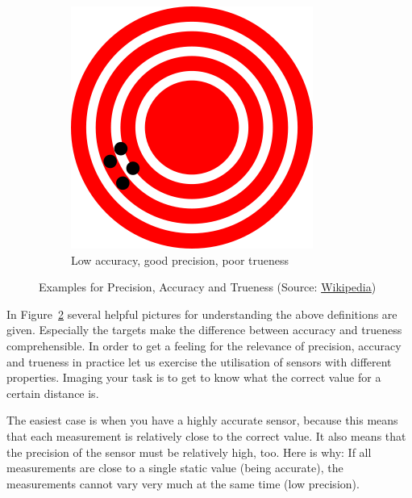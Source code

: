 \begin{figure}[htbp]
\begin{subfigure}[b]{0.2\textwidth}
 \includegraphics[width=\textwidth]{pic/High_precision_Low_accuracy.png}
 \caption{Low accuracy, good precision, poor trueness}
 \label{sfig:high_precision}
 \end{subfigure}
 \caption{Examples for Precision, Accuracy and Trueness (Source: \href{https://en.wikipedia.org/wiki/Accuracy_and_precision}{Wikipedia})}
 \label{fig:prec_accur_truen}
\end{figure}

In Figure~\ref{fig:prec_accur_truen} several helpful pictures for understanding the above definitions are given. Especially the targets make the difference between accuracy and trueness comprehensible. In order to get a feeling for the relevance of precision, accuracy and trueness in practice let us exercise the utilisation of sensors with different properties. Imaging your task is to get to know what the correct value for a certain distance is.

The easiest case is when you have a highly accurate sensor, because this means that each measurement is relatively close to the correct value. It also means that the precision of the sensor must be relatively high, too. Here is why: If all measurements are close to a single static value (being accurate), the measurements cannot vary very much at the same time (low precision).


